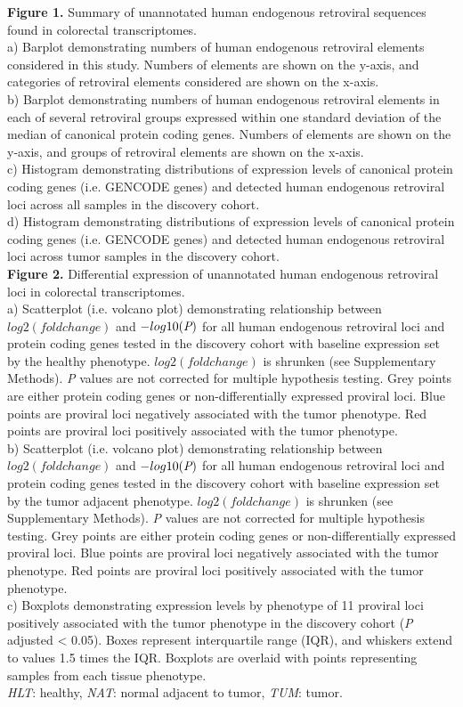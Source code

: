 \textbf{Figure 1.} Summary of unannotated human endogenous retroviral sequences found in colorectal transcriptomes. \\
a) Barplot demonstrating numbers of human endogenous retroviral elements considered in this study.
Numbers of elements are shown on the y-axis, and categories of retroviral elements considered are shown on the x-axis. \\
b) Barplot demonstrating numbers of human endogenous retroviral elements in each of several retroviral groups expressed within one standard deviation of the median of canonical protein coding genes.
Numbers of elements are shown on the y-axis, and groups of retroviral elements are shown on the x-axis. \\
c) Histogram demonstrating distributions of expression levels of canonical protein coding genes (i.e. GENCODE genes) and detected human endogenous retroviral loci across all samples in the discovery cohort. \\
d) Histogram demonstrating distributions of expression levels of canonical protein coding genes (i.e. GENCODE genes) and detected human endogenous retroviral loci across tumor samples in the discovery cohort. \\

\textbf{Figure 2.} Differential expression of unannotated human endogenous retroviral loci in colorectal transcriptomes. \\
a) Scatterplot (i.e. volcano plot) demonstrating relationship between $log2(fold change)$ and $-log10(\emph{P})$ for all human endogenous retroviral loci and protein coding genes tested in the discovery cohort with baseline expression set by the healthy phenotype.
$log2(fold change)$ is shrunken (see Supplementary Methods).
\emph{P} values are not corrected for multiple hypothesis testing.
Grey points are either protein coding genes or non-differentially expressed proviral loci.
Blue points are proviral loci negatively associated with the tumor phenotype.
Red points are proviral loci positively associated with the tumor phenotype. \\
b) Scatterplot (i.e. volcano plot) demonstrating relationship between $log2(fold change)$ and $-log10(\emph{P})$ for all human endogenous retroviral loci and protein coding genes tested in the discovery cohort with baseline expression set by the tumor adjacent phenotype.
$log2(fold change)$ is shrunken (see Supplementary Methods).
\emph{P} values are not corrected for multiple hypothesis testing.
Grey points are either protein coding genes or non-differentially expressed proviral loci.
Blue points are proviral loci negatively associated with the tumor phenotype.
Red points are proviral loci positively associated with the tumor phenotype. \\
c) Boxplots demonstrating expression levels by phenotype of 11 proviral loci positively associated with the tumor phenotype in the discovery cohort (\emph{P} adjusted < 0.05).
Boxes represent interquartile range (IQR), and whiskers extend to values 1.5 times the IQR.
Boxplots are overlaid with points representing samples from each tissue phenotype. \\
\emph{HLT}: healthy, \emph{NAT}: normal adjacent to tumor, \emph{TUM}: tumor. \\

